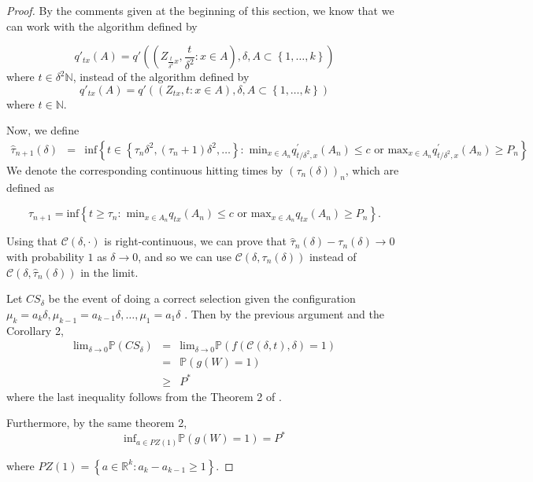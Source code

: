 \documentclass{wscpaperproc}
\theoremstyle{wsc}
\begin{document}
\begin{proof}


By the comments given at the beginning of this section, we know that
we can work with the algorithm defined by

\[
q'_{tx}\left(A\right)=q'\left(\left(Z_{\frac{t}{\delta^{2}}x},\frac{t}{\delta^{2}}:x\in A\right),\delta,A\subset\left\{ 1,\ldots,k\right\} \right)
\]
where $t\in\delta^{2}\mathbb{N}$, instead of the algorithm defined
by
\[
q'_{tx}\left(A\right)=q'\left(\left(Z_{tx},t:x\in A\right),\delta,A\subset\left\{ 1,\ldots,k\right\} \right)
\]
where $t\in\mathbb{N}$.

Now, we define
\begin{eqnarray*}
\hat{\tau}_{n+1}\left(\delta\right) & = & \mbox{inf}\left\{ t\in\left\{ \tau_{n}\delta^{2},\left(\tau_{n}+1\right)\delta^{2},\ldots\right\} :\mbox{ min}_{x\in A_{n}}q_{t/\delta^{2},x}^{'}\left(A_{n}\right)\leq c\mbox{ or }\mbox{max}_{x\in A_{n}}q_{t/\delta^{2},x}^{'}\left(A_{n}\right)\geq P_{n}\right\} 
\end{eqnarray*}
We denote the corresponding continuous hitting times by $\left(\tau_{n}\left(\delta\right)\right)_{n}$,
which are defined as 

\[
\tau_{n+1}=\mbox{inf}\left\{ t\geq\tau_{n}:\mbox{ min}_{x\in A_{n}}q_{tx}\left(A_{n}\right)\leq c\mbox{ or }\mbox{max}_{x\in A_{n}}q_{tx}\left(A_{n}\right)\geq P_{n}\right\} .
\]

Using that $\mathcal{C}\left(\delta,\cdot\right)$ is right-continuous,
we can prove that $\hat{\tau}_{n}\left(\delta\right)-\tau_{n}\left(\delta\right)\rightarrow0$
with probability $1$ as $\delta\rightarrow0$, and so we can use
$\mathcal{C}\left(\delta,\tau_{n}\left(\delta\right)\right)$ instead
of $\mathcal{C}\left(\delta,\hat{\tau}_{n}\left(\delta\right)\right)$
in the limit.

Let $CS_{\delta}$ be the event of doing a correct selection given
the configuration $\mu_{k}=a_{k}\delta,\mu_{k-1}=a_{k-1}\delta,\ldots,\mu_{1}=a_{1}\delta$
$ $. Then by the previous argument and the Corollary 2, 
\begin{eqnarray*}
\mbox{lim}_{\delta\rightarrow0}\mathbb{P}\left(CS_{\delta}\right) & = & \mbox{lim}_{\delta\rightarrow0}\mathbb{P}\left(f\left(\mathcal{C}\left(\delta,t\right),\delta\right)=1\right)\\
 & = & \mathbb{P}\left(g\left(W\right)=1\right)\\
 & \geq & P^{*}
\end{eqnarray*}
where the last inequality follows from the Theorem 2 of .

Furthermore, by the same theorem 2,
\[
\mbox{inf}_{a\in PZ\left(1\right)}\mathbb{P}\left(g\left(W\right)=1\right)=P^{*}
\]


where $PZ\left(1\right)=\left\{ a\in\mathbb{R}^{k}:a_{k}-a_{k-1}\geq1\right\} $. 

\end{proof}
\end{document}
